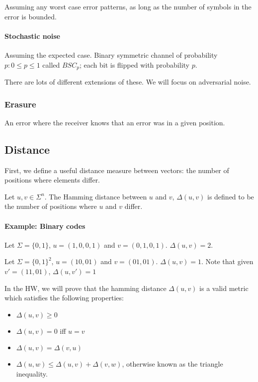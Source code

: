 \documentclass{idc_msc}
\begin{document}
Assuming any worst case error patterns, as long as the number of symbols in the error is bounded.

\paragraph{Stochastic noise}

Assuming the expected case. Binary symmetric channel of probability $p : 0 \le p \le 1$ called $BSC_p$; each bit is flipped with probability $p$.

There are lots of different extensions of these.
We will focus on adversarial noise.

\subsubsection{Erasure}

An error where the receiver knows that an error was in a given position.

\subsection{Distance}

First, we define a useful distance measure between vectors: the number of positions where elements differ.

Let $u,v \in \Sigma^n$. The Hamming distance between $u$ and $v$, $\Delta(u,v)$ is defined to be the number of positions where $u$ and $v$ differ.

\paragraph{Example: Binary codes}

Let $\Sigma=\{0,1\}$, $u = (1,0,0,1)$ and $v = (0,1,0,1)$. $\Delta(u,v) = 2$.

Let $\Sigma=\{0,1\}^2$, $u = (10,01)$ and $v = (01,01)$. $\Delta(u,v) = 1$.
Note that given $v'=(11,01)$, $\Delta(u,v') = 1$

In the HW, we will prove that the hamming distance $\Delta(u,v)$ is a valid metric which satisfies the following properties:

\begin{itemize}
  \item $\Delta(u,v) \ge 0$
  \item $\Delta(u,v) = 0$ iff $u = v$
  \item $\Delta(u,v) = \Delta(v,u)$
  \item $\Delta(u,w) \le \Delta(u,v) + \Delta(v,w)$, otherwise known as the triangle inequality.
\end{itemize}
\end{document}
